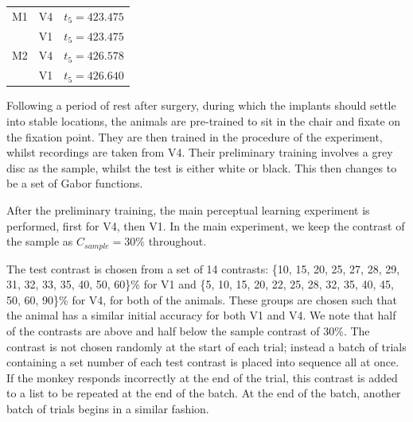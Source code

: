 \begin{table}[hbtp]
\begin{center}
\begin{tabular}{rlr}
\\
\midrule
M1  & V4    & $t_5 = 423.475$
\\
        & V1    & $t_5 = 423.475$
\\
M2    & V4    & $t_5 = 426.578$
\\
        & V1    & $t_5 = 426.640$
\\
\bottomrule
\end{tabular}
\end{center}
\end{table}

Following a period of rest after surgery, during which the implants should settle into stable locations, the animals are pre-trained to sit in the chair and fixate on the fixation point. They are then trained in the procedure of the experiment, whilst recordings are taken from V4. Their preliminary training involves a grey disc as the sample, whilst the test is either white or black. This then changes to be a set of Gabor functions.


After the preliminary training, the main perceptual learning experiment is performed, first for V4, then V1.
In the main experiment, we keep the contrast of the sample as $C_{sample} = 30\%$ throughout.

The test contrast is chosen from a set of 14 contrasts:
\{10, 15, 20, 25, 27, 28, 29, 31, 32, 33, 35, 40, 50, 60\}\% for V1 and
 \{5, 10, 15, 20, 22, 25, 28, 32, 35, 40, 45, 50, 60, 90\}\% for V4,
for both of the animals. These groups are chosen such that the animal has a similar initial accuracy for both V1 and V4. We note that half of the contrasts are above and half below the sample contrast of 30\%.
The contrast is not chosen randomly at the start of each trial; instead a batch of trials containing a set number of each test contrast is placed into sequence all at once.
If the monkey responds incorrectly at the end of the trial, this contrast is added to a list to be repeated at the end of the batch.
At the end of the batch, another batch of trials begins in a similar fashion.

